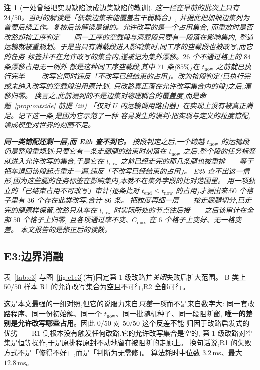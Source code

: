\documentclass[manuscript,screen,review]{acmart}
\newcommand{\NPairs}{50}
\newcommand{\FeasRone}{0/\NPairs}            %
\newcommand{\FeasRtwo}{\NPairs/\NPairs}      %
\newcommand{\MsRepairMed}{3.2}
\newcommand{\MsRepairMax}{12.8}
\newtheorem{remark}{注}
\begin{document}
\begin{remark}[一处曾经把实现缺陷读成边集缺陷的教训]
\label{rem:e2b_history}
这一栏在早前的批次上只有 \(24/\NPairs\)。当时的解读是「依赖边集未能覆盖若干弱耦合」,
并据此把加细边集列为首要后续工作。复核后该解读是错的。允许改写的是一个\emph{占用}集合,
而重放时是否改路却按\emph{工序}判定——同一工序的空载段与满载段只要有一段落在影响集内,
整道运输就被重规划。于是当只有满载段进入影响集时,同工序的空载段也被改写,而它的任务
标签并不在允许改写的集合内,遂被记为集外漂移。\(26\) 个不通过格上的 \(84\) 条漂移占用无一例外
都是这种同工序空载段,其中 \(71\) 条(\(85\%\))在 \(t_{\mathrm{now}}\) 之前就已执行完毕
——改写它同时违反「不改写已经结束的占用」。改为按\emph{段}判定(已执行完或未纳入改写的空载段沿用原计划,
只改路真正落在允许改写集合内的段)之后,漂移归零。
换言之,此前测到的不是边集对物理耦合的覆盖度,而是命题~\ref{prop:outside} 前提 (iii)
「仅对 \(U\) 内运输调用路由器」在实现上没有被真正满足。记下这一条,是因为它示范了一种
容易发生的误判:把实现与定义的粒度错配,读成模型对世界的刻画不足。

\textbf{同一类错配还剩一层,而 E2b 查不到它。} 按段判定之后,一个\emph{跨越}
\(t_{\mathrm{now}}\) 的运输段仍是整段重规划:只要它有一条走廊腿的结束时刻落在
\(t_{\mathrm{now}}\) 之后,整个段的任务标签就进入允许改写的集合,于是它在 \(t_{\mathrm{now}}\)
之前\emph{已经走完}的那几条腿也被重排——等于把车退回该段起点重走一遍,违反「不改写已经结束的占用」。
E2b 查不出这一情形,因为这些腿的任务标签在影响集\emph{内},本就不在集外字段的比对范围里。
用一项独立的「已结束占用不可改写」审计(逐条比对 \(t_{\mathrm{end}}\le t_{\mathrm{now}}\)
的占用)才测出来:\(\NPairs\) 个格子里有 \(36\) 个存在此类改写,合计 \(86\) 条。
把粒度再细一层——按\emph{走廊腿}切分,已走完的腿原样保留,改路只从车在
\(t_{\mathrm{now}}\) 时实际所处的节点往后接——之后该审计在全部 \(\NPairs\) 个格子上归零,
且各项通过率不变、\(C_{\max}\) 在 \(6\) 个格子上变好、无一格变差。
本文报告的是修正后的读数。
\end{remark}

\subsection{E3:边界消融}
\label{sec:e3}

表~\ref{tab:e3} 与图~\ref{fig:e1e3}(右)固定第 1 级改路并\emph{关闭}失败后扩大范围。
B 类上 \(\NPairs/\NPairs\) 样本 R1 的允许改写集合为空且不可行,R2 全部可行。

这是本文最强的一组对照,但它的说服力来自\emph{只差一项}而不是来自数字大:
同一套改路程序、同一份初始解、同一个 \(t_{\mathrm{now}}\)、同一批随机种子、同一段阻断窗,
\textbf{唯一的差别是允许改写哪些占用}。因此 \(\FeasRone\) 对 \(\FeasRtwo\) 这个反差不能
归因于改路启发式的优劣——R1 侧根本没有触发任何改路,它的允许改写集合是空的,
第 1 级改路对空集是恒等操作,于是原排程原封不动地留在被阻断的走廊上。
换句话说,R1 的失败方式不是「修得不好」,而是「判断为无需修」。
算法耗时中位数 \(\MsRepairMed\)\,ms、最大 \(\MsRepairMax\)\,ms。
\end{document}
